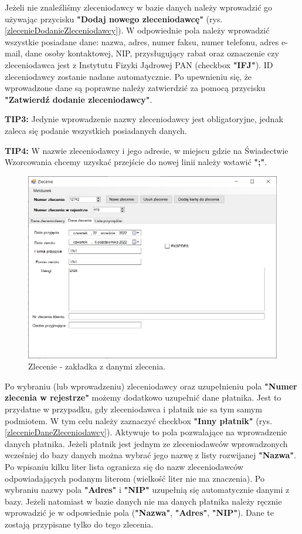 Jeżeli nie znaleźliśmy zleceniodawcy w bazie danych należy wprowadzić go używając przycisku \textbf{"Dodaj nowego zleceniodawcę"} (rys. \ref{zlecenieDodanieZleceniodawcy}). W odpowiednie pola należy wprowadzić wszystkie posiadane dane: nazwa, adres, numer faksu, numer telefonu, adres e-mail, dane osoby kontaktowej, NIP, przysługujący rabat oraz oznaczenie czy zleceniodawca jest z Instytutu Fizyki Jądrowej PAN (checkbox  \textbf{"IFJ"}). ID zleceniodawcy zostanie nadane automatycznie. Po upewnieniu się, że wprowadzone dane są poprawne należy zatwierdzić za pomocą przycisku \textbf{"Zatwierdź dodanie zleceniodawcy"}.

\textbf{TIP3:} Jedynie wprowadzenie nazwy zleceniodawcy jest obligatoryjne, jednak zaleca się podanie wszystkich posiadanych danych.

\textbf{TIP4:} W nazwie zleceniodawcy i jego adresie, w miejscu gdzie na Świadectwie Wzorcowania chcemy uzyskać przejście do nowej linii należy wstawić \textbf{";"}. 

\begin{figure}[htb]
	\centering
	\includegraphics[width=\columnwidth]{obrazki/Biuro/zlecenie/zlecenie_dane_zlecenia.png}
	\caption{Zlecenie - zakładka z danymi zlecenia.}
	\label{zlecenieDaneZlecenia}
\end{figure}

Po wybraniu (lub wprowadzeniu) zleceniodawcy oraz uzupełnieniu pola \textbf{"Numer zlecenia w rejestrze"} możemy dodatkowo uzupełnić dane płatnika. Jest to przydatne w przypadku, gdy zleceniodawca i płatnik nie sa tym samym podmiotem. W tym celu należy zaznaczyć checkbox \textbf{"Inny płatnik"} (rys. \ref{zlecenieDaneZleceniodawcy}). Aktywuje to pola pozwalające na wprowadzenie danych płatnika. Jeżeli płatnik jest jednym ze zleceniodawców wprowadzonych wcześniej do bazy danych można wybrać jego nazwę z listy rozwijanej \textbf{"Nazwa"}. Po wpisaniu kilku liter lista ogranicza się do nazw zleceniodawców odpowiadających podanym literom (wielkość liter nie ma znaczenia). Po wybraniu nazwy pola \textbf{"Adres"} i \textbf{"NIP"} uzupełnią się automatycznie danymi z bazy. Jeżeli natomiast w bazie danych nie ma danych płatnika należy ręcznie wprowadzić je w odpowiednie pola (\textbf{"Nazwa"}, \textbf{"Adres"}, \textbf{"NIP"}). Dane te zostają przypisane tylko do tego zlecenia.


